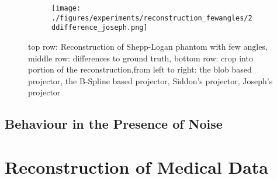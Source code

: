 \begin{figure}[h]
{{\begin{subfigure}[b]{0.3125\textwidth}
				\texttt{[image: ./figures/experiments/reconstruction\_fewangles/2ddifference\_joseph.png]}
			\end{subfigure}
		}}
	\caption{top row: Reconstruction of Shepp-Logan phantom with few angles, middle row:
        differences to ground truth, bottom row: crop into portion of the reconstruction,from left
        to right: the blob based projector, the B-Spline based projector, Siddon's projector,
        Joseph's projector}%
	\label{fig:reconstruction_fewangles}
\end{figure}

\subsection{Behaviour in the Presence of Noise}


\section{Reconstruction of Medical Data}\label{sec:experiments_medical_projection}

